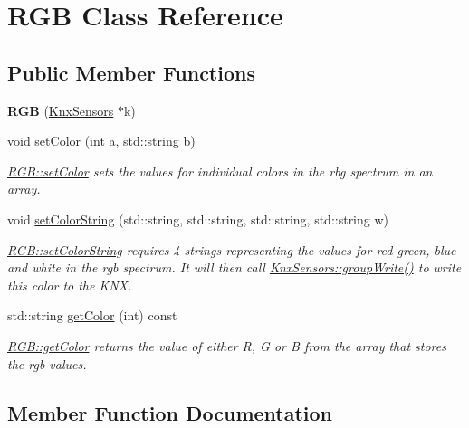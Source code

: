 \hypertarget{class_r_g_b}{}\section{R\+G\+B Class Reference}
\label{class_r_g_b}
\subsection*{Public Member Functions}
\begin{DoxyCompactItemize}
\item 
\hypertarget{class_r_g_b_a20a90bc14a1fafd72c43746877fe5801}{}{\bfseries R\+G\+B} (\hyperlink{class_knx_sensors}{Knx\+Sensors} $\ast$k)\label{class_r_g_b_a20a90bc14a1fafd72c43746877fe5801}

\item 
void \hyperlink{class_r_g_b_a0104a87de93066bb7572e4f1be73d97f}{set\+Color} (int a, std\+::string b)
\begin{DoxyCompactList}\small\item\em \hyperlink{class_r_g_b_a0104a87de93066bb7572e4f1be73d97f}{R\+G\+B\+::set\+Color} sets the values for individual colors in the rbg spectrum in an array. \end{DoxyCompactList}\item 
void \hyperlink{class_r_g_b_a7e60f73344bab1eae6e7dff07d785e39}{set\+Color\+String} (std\+::string, std\+::string, std\+::string, std\+::string w)
\begin{DoxyCompactList}\small\item\em \hyperlink{class_r_g_b_a7e60f73344bab1eae6e7dff07d785e39}{R\+G\+B\+::set\+Color\+String} requires 4 strings representing the values for red green, blue and white in the rgb spectrum. It will then call \hyperlink{class_knx_sensors_abf8b11a2204e9d076a0860f14a1f2cdc}{Knx\+Sensors\+::group\+Write()} to write this color to the K\+N\+X. \end{DoxyCompactList}\item 
std\+::string \hyperlink{class_r_g_b_ab03f8e6d34cf93fb712a925d9404f123}{get\+Color} (int) const 
\begin{DoxyCompactList}\small\item\em \hyperlink{class_r_g_b_ab03f8e6d34cf93fb712a925d9404f123}{R\+G\+B\+::get\+Color} returns the value of either R, G or B from the array that stores the rgb values. \end{DoxyCompactList}\end{DoxyCompactItemize}


\subsection{Member Function Documentation}
\hypertarget{class_r_g_b_ab03f8e6d34cf93fb712a925d9404f123}{}
